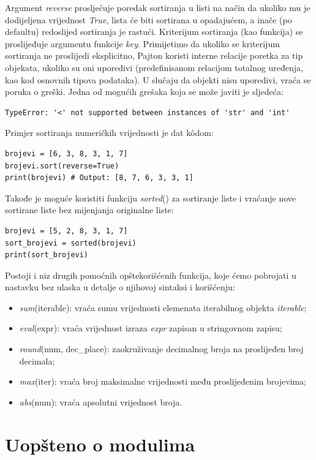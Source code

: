 Argument \textit{reverse} prosljećuje poredak sortiranja u listi na način da ukoliko mu je dodijeljena vrijednost \emph{True}, lista će biti sortirana u opadajućem, a inače (po defaultu) redoslijed sortiranja je rastući. Kriterijum sortiranja (kao funkcija) se proslijeđuje argumentu funkcije \textit{key}. Primijetimo da ukoliko se kriterijum sortiranja ne proslijedi eksplicitno, Pajton koristi interne relacije poretka za tip objekata, ukoliko su oni uporedivi (predefinisanom relacijom totalnog uređenja, kao kod osnovnih tipova podataka). U slučaju da objekti nisu uporedivi, vraća se poruka o greški.  Jedna od mogućih grešaka koja se može javiti je sljedeća:
\begin{verbatim}
TypeError: '<' not supported between instances of 'str' and 'int'
\end{verbatim}


Primjer sortiranja numeričkih vrijednosti je dat k\^odom:
\begin{verbatim}
brojevi = [6, 3, 8, 3, 1, 7]
brojevi.sort(reverse=True)
print(brojevi) # Output: [8, 7, 6, 3, 3, 1]
\end{verbatim}
  Takođe je moguće koristiti funkciju \textit{sorted}() za sortiranje liste i vraćanje nove sortirane liste bez mijenjanja originalne liste:
\begin{verbatim}
brojevi = [5, 2, 8, 3, 1, 7]
sort_brojevi = sorted(brojevi)
print(sort_brojevi)
\end{verbatim}

Postoji i niz drugih pomoćnih opštekorišćenih funkcija, koje ćemo pobrojati u nastavku bez ulaska u detalje o njihovoj sintaksi i korišćenju:
\begin{itemize}
	\item \textit{sum}(iterable): vraća sumu vrijednosti elemenata iterabilnog objekta \emph{iterable};
	\item \textit{eval}(expr): vraća vrijednost izraza \emph{expr} zapisan u stringovnom zapisu;
	\item \textit{round}(num, dec\_place): zaokruživanje decimalnog broja na proslijeđen broj decimala;
	\item \textit{max}(iter): vraća broj maksimalne vrijednosti među proslijeđenim brojevima;
	\item \textit{abs}(num): vraća apsolutni vrijednost broja. 
\end{itemize}
\section{Uopšteno o modulima}

